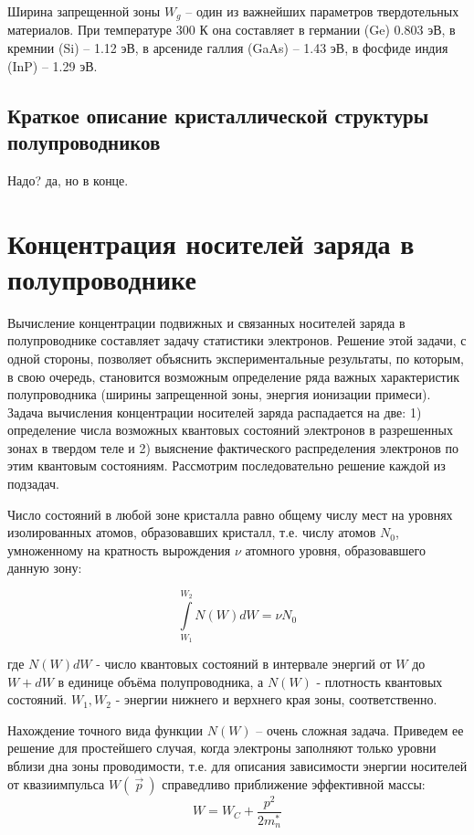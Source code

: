 Ширина запрещенной зоны $W_g$  – один из важнейших параметров твердотельных материалов.
При температуре 300 К она составляет в германии (Ge) 0.803 эВ, в кремнии (Si) – 1.12 эВ, в арсениде галлия (GaAs) – 1.43
эВ, в фосфиде индия (InP) – 1.29 эВ.

\subsection{Краткое описание кристаллической структуры полупроводников}
Надо? да, но в конце.

\section{Концентрация носителей заряда в полупроводнике}
Вычисление концентрации подвижных и связанных носителей заряда в полупроводнике составляет задачу статистики электронов.
Решение этой задачи, с одной стороны, позволяет объяснить экспериментальные результаты, по которым, в свою очередь,
становится возможным определение ряда важных характеристик полупроводника (ширины запрещенной зоны, энергия ионизации примеси).
Задача вычисления концентрации носителей заряда распадается на две:  1) определение числа возможных квантовых состояний
электронов в разрешенных зонах в твердом теле и 2) выяснение фактического распределения электронов по этим квантовым
состояниям. Рассмотрим последовательно решение каждой из подзадач.

Число состояний в любой зоне кристалла равно общему числу мест на уровнях изолированных атомов, образовавших кристалл,
т.е. числу атомов $N_0$, умноженному на кратность вырождения $\nu$ атомного уровня, образовавшего данную зону:

\begin{equation}
	\int \limits_{W_1}^{W_2} N(W) dW  =\nu N_0 
	\label{eq:1}
\end{equation} 

где $N(W)dW$ - число  квантовых состояний в интервале энергий от $W$ до $W+dW$ в единице объёма полупроводника, а $N(W)$
-  плотность квантовых состояний. $W_1,W_2$ - энергии нижнего и верхнего края зоны, соответственно. 

Нахождение точного вида функции $N(W)$ – очень сложная задача. Приведем ее решение для простейшего случая, когда электроны
заполняют только уровни вблизи дна зоны проводимости, т.е. для описания зависимости энергии носителей от квазиимпульса
$W(~\vec{p}~)$ справедливо приближение эффективной массы:   
\begin{equation}
	W = W_C + \frac{p^2}{2m_n^*}
	\label{eq:2}
\end{equation}

